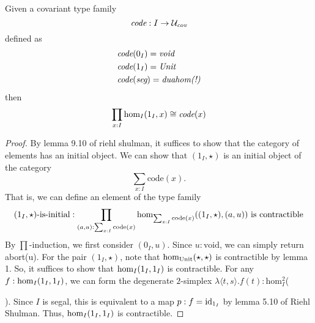 \documentclass[main.tex]{subfiles}
\begin{document}
\begin{lemma}
    Given a covariant type family $$\emph{code} : I \to \mathcal{U_{\emph{cov}}}$$
    defined as
    \begin{align*}
        &\emph{code}(0_I) = \emph{void}\\
        &\emph{code}(1_I) = \emph{Unit}\\
        &\emph{code}(\emph{\seg}) = \emph{duahom(!)}
    \end{align*}
    then
    $$\prod_{x:I}\ho[I]{1_I}{x}\cong \emph{code}(x)$$
\end{lemma}
\begin{proof}
    By lemma 9.10 of riehl shulman, it suffices to show that the category of elements has an initial object. We can show that $(1_I, \star)$ is an initial object of the category $$\sum_{x:I}\text{code}(x).$$ That is, we can define an element of the type family
    $$(1_I,\star)\text{-is-initial}:\prod_{(a,u):\sum_{x:I}\text{code}(x)}\ho[\sum_{x:I}\text{code}(x)]{(1_I,\star)}{(a,u)} \text{ is contractible}$$
    By $\prod$-induction, we first consider $(0_I, u)$. Since $u : \text{void}$, we can simply return abort(u). For the pair $(1_I, \star)$, note that $\ho[\text{Unit}]{\star}{\star}$ is contractible by lemma 1. So, it suffices to show that $\ho[I]{1_I}{1_I}$ is contractible. For any $f : \ho[I]{1_I}{1_I}$, we can form the degenerate $2$-simplex $\lambda\langle t, s \rangle.f(t) : $hom$^2_I$(
    ). Since $I$ is segal, this is equivalent to a map $p : f = \id{1_I}$ by lemma 5.10 of Riehl Shulman. Thus, $\ho[I]{1_I}{1_I}$ is contractible.
\end{proof}
\end{document}
